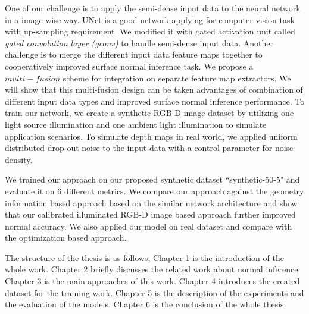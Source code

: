 One of our challenge is to apply the semi-dense input data to the neural network in a image-wise way. UNet is a good network applying for computer vision task with up-sampling requirement. We modified it with gated activation unit called \textit{gated convolution layer (gconv)} to handle semi-dense input data. Another challenge is to merge the different input data feature maps together to cooperatively improved surface normal inference task. We propose a $ multi-fusion $ scheme for integration on separate feature map extractors. We will show that this multi-fusion design can be taken advantages of combination of different input data types and improved surface normal inference performance. To train our network, we create a synthetic RGB-D image dataset by utilizing one light source illumination and one ambient light illumination to simulate application scenarios. To simulate depth maps in real world, we applied uniform distributed drop-out noise to the input data with a control parameter for noise density.

We trained our approach on our proposed synthetic dataset ``synthetic-50-5" and evaluate it on 6 different metrics. We compare our approach against the geometry information based approach based on the similar network architecture and show that our calibrated illuminated RGB-D image based approach further improved normal accuracy. We also applied our model on real dataset and compare with the optimization based approach.

The structure of the thesis is as follows, Chapter 1 is the introduction of the whole work. Chapter 2 briefly discusses the related work about normal inference. Chapter 3 is the main approaches of this work. Chapter 4 introduces the created dataset for the training work. Chapter 5 is the description of the experiments and the evaluation of the models. Chapter 6 is the conclusion of the whole thesis.



